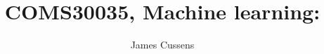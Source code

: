 \usepackage{amsmath, amssymb, graphicx}
\usepackage[]{algorithm2e}
\usepackage{pdfpages}
\usepackage{bm}
\usepackage{bbm}
\usepackage{relsize}
\usepackage[british]{babel}
\usepackage{tikz,tikzsymbols}
\usepackage{hyperref}
\usepackage{cancel}
\usepackage{caption,subcaption}
\usepackage{adjustbox}
\usepackage{overpic}
\usepackage[UKenglish]{isodate}

\usetikzlibrary{arrows,decorations.markings}

\newcommand{\bs}{\boldsymbol}


\hypersetup{colorlinks,linkcolor=,urlcolor=blue}
\newenvironment{titledslide}[1]{\begin{frame}\frametitle{#1}}{\end{frame}}



\author{James Cussens}

\title{COMS30035, Machine learning:\\ \vspace{5pt} \lecttitle}




\begin{frame}
  \titlepage
\end{frame}

